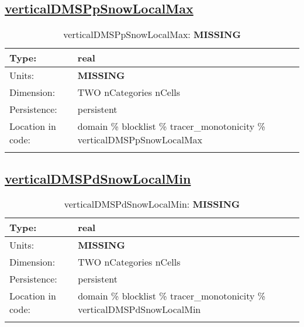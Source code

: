 \subsection[verticalDMSPpSnowLocalMax]{\hyperref[sec:var_tab_tracer_monotonicity]{verticalDMSPpSnowLocalMax}}
\label{subsec:var_sec_tracer_monotonicity_verticalDMSPpSnowLocalMax}
\begin{center}
\begin{longtable}{| p{2.0in} | p{4.0in} |}
        \hline 
        Type: & real \\
        \hline 
        Units: & {\bf \color{red} MISSING} \\
        \hline 
        Dimension: & TWO nCategories nCells \\
        \hline 
        Persistence: & persistent \\
        \hline 
         Location in code: & domain \% blocklist \% tracer\_monotonicity \% verticalDMSPpSnowLocalMax \\
         \hline 
    \caption{verticalDMSPpSnowLocalMax: {\bf \color{red} MISSING}}
\end{longtable}
\end{center}
\subsection[verticalDMSPdSnowLocalMin]{\hyperref[sec:var_tab_tracer_monotonicity]{verticalDMSPdSnowLocalMin}}
\label{subsec:var_sec_tracer_monotonicity_verticalDMSPdSnowLocalMin}
\begin{center}
\begin{longtable}{| p{2.0in} | p{4.0in} |}
        \hline 
        Type: & real \\
        \hline 
        Units: & {\bf \color{red} MISSING} \\
        \hline 
        Dimension: & TWO nCategories nCells \\
        \hline 
        Persistence: & persistent \\
        \hline 
         Location in code: & domain \% blocklist \% tracer\_monotonicity \% verticalDMSPdSnowLocalMin \\
         \hline 
    \caption{verticalDMSPdSnowLocalMin: {\bf \color{red} MISSING}}
\end{longtable}
\end{center}
